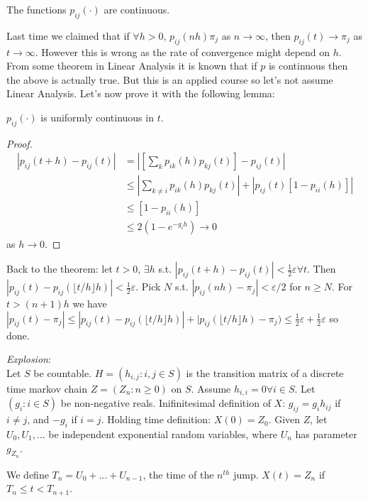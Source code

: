 \documentclass[a4paper]{article}
\begin{document}
\begin{lemma}
The functions $p_{ij}(\cdot)$ are continuous.
\end{lemma}

Last time we claimed that if $\forall h>0$, $p_{ij}(nh) \pi_j$ as $n \to \infty$, then $p_{ij}(t) \to \pi_j$ as $t \to \infty$. However this is wrong as the rate of convergence might depend on $h$.\\
From some theorem in Linear Analysis it is known that if $p$ is continuous then the above is actually true. But this is an applied course so let's not assume Linear Analysis. Let's now prove it with the following lemma:
\begin{lemma}
$p_{ij}(\cdot)$ is uniformly continuous in $t$.
\begin{proof}
\begin{equation*}
\begin{aligned}
|p_{ij}(t+h)-p_{ij}(t)| &= |[\sum_k p_{ik}(h) p_{kj}(t)] - p_{ij}(t)|\\
&\leq |\sum_{k \neq i} p_{ik}(h) p_{kj}(t) | + |p_{ij}(t) [1- p_{ii}(h)]|\\
&\leq [1-p_{ii}(h)]\\
&\leq 2(1-e^{-g_i h}) \to 0
\end{aligned}
\end{equation*}
as $h \to 0$.
\end{proof}
\end{lemma}
Back to the theorem: let $t>0$, $\exists h$ s.t. $|p_{ij}(t+h) - p_{ij}(t)| < \frac{1}{2}\varepsilon \forall t$. Then $|p_{ij}(t) - p_{ij}(\lfloor t/h \rfloor h)| < \frac{1}{2} \varepsilon$. Pick $N$ s.t. $|p_{ij}(nh) -\pi_j| < \varepsilon/2$ for $n \geq N$. For $t>(n+1)h$ we have $|p_{ij}(t) - \pi_j| \leq |p_{ij}(t) - p_{ij}(\lfloor t/h\rfloor h)| + |p_{ij}(\lfloor t/h \rfloor h) - \pi_j) \leq \frac{1}{2}\varepsilon + \frac{1}{2} \varepsilon$ so done.

\emph{Explosion}:\\
Let $S$ be countable. $H=(h_{i,j}:i,j \in S)$ is the transition matrix of a discrete time markov chain $Z = (Z_n : n \geq 0)$ on $S$. Assume $h_{i,i} = 0 \forall i \in S$. Let $(g_i:i \in S)$ be non-negative reals. Inifinitesimal definition of $X$: $g_{ij} = g_i h_{ij}$ if $i \neq j$, and $-g_i$ if $i=j$. Holding time definition: $X(0) = Z_0$. Given $Z$, let $U_0,U_1,...$ be independent exponential random variables, where $U_n$ has parameter $g_{Z_n}$.

We define $T_n = U_0 + ... + U_{n-1}$, the time of the $n^{th}$ jump. $X(t) = Z_n$ if $T_n \leq t < T_{n+1}$.
\end{document}

